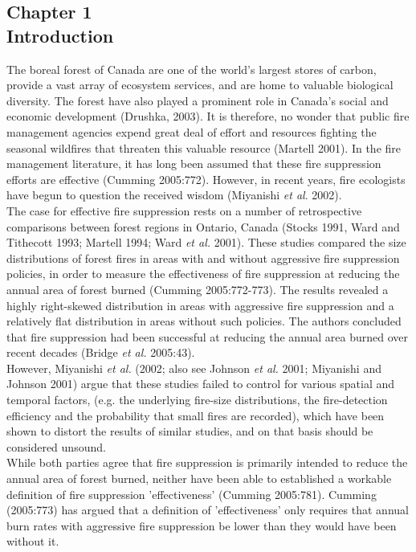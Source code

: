 \documentclass{article}
\begin{document}
\begin{spacing}{1.5}
\phantom
\phantom
\section*{Chapter 1 \\ \huge{Introduction}}
\phantom
\phantom
The boreal forest of Canada are one of the world's largest stores of carbon, provide a vast array of ecosystem services, and are home to valuable biological diversity. The forest have also played a prominent role in Canada's social and economic development (Drushka, 2003). It is therefore, no wonder that public fire management agencies expend great deal of effort and resources fighting the seasonal wildfires that threaten this valuable resource (Martell 2001). In the fire management literature, it has long been assumed that these fire suppression efforts are effective (Cumming 2005:772). However, in recent years, fire ecologists have begun to question the received wisdom (Miyanishi {\it et al}. 2002). \\

The case for effective fire suppression rests on a number of retrospective comparisons between forest regions in Ontario, Canada (Stocks 1991, Ward and Tithecott 1993; Martell 1994; Ward {\it et al.} 2001). These studies compared the size distributions of forest fires in areas with and without aggressive fire suppression policies, in order to measure the effectiveness of fire suppression at reducing the annual area of forest burned (Cumming 2005:772-773). The results revealed a highly right-skewed distribution in areas with aggressive fire suppression and a relatively flat distribution in areas without such policies. The authors concluded that fire suppression had been successful at reducing the annual area burned over recent decades (Bridge {\it et al.} 2005:43). \\

However, Miyanishi {\it et al.} (2002; also see Johnson {\it et al.} 2001; Miyanishi and Johnson 2001) argue that these studies failed to control for various spatial and temporal factors, (e.g. the underlying fire-size distributions, the fire-detection efficiency and the probability that small fires are recorded), which have been shown to distort the results of similar studies, and on that basis should be considered unsound. \\

While both parties agree that fire suppression is primarily intended to reduce the annual area of forest burned, neither have been able to established a workable definition of fire suppression 'effectiveness' (Cumming 2005:781). Cumming (2005:773) has argued that a definition of 'effectiveness' only requires that annual burn rates with aggressive fire suppression be lower than they would have been without it. \\

\end{spacing}
\clearpage
\end{document}
